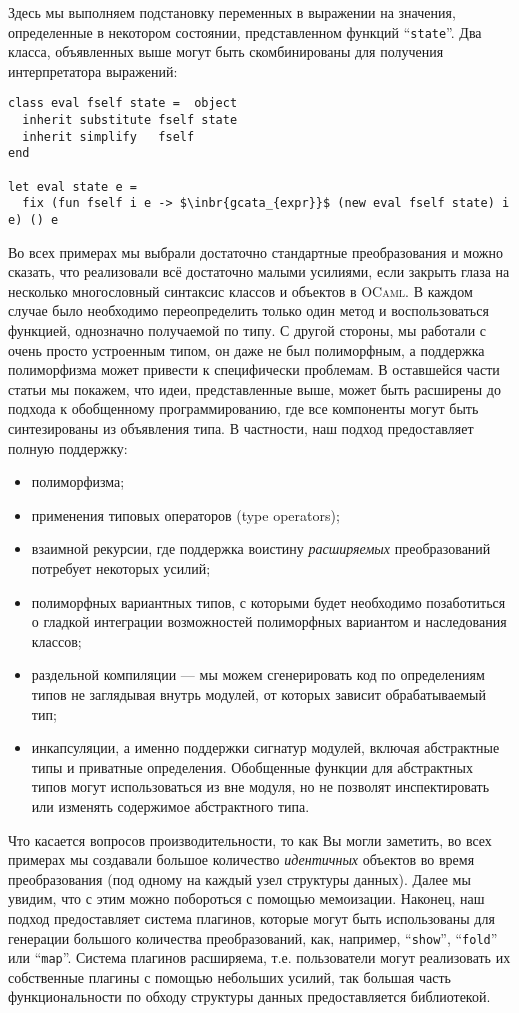 Здесь мы выполняем подстановку переменных в выражении на значения, определенные в некотором состоянии, представленном функций ``\lstinline{state}''. Два класса, объявленных выше могут быть скомбинированы для получения интерпретатора выражений:

\begin{lstlisting}
class eval fself state =  object
  inherit substitute fself state
  inherit simplify   fself
end

let eval state e =
  fix (fun fself i e -> $\inbr{gcata_{expr}}$ (new eval fself state) i e) () e  
\end{lstlisting}

Во всех примерах мы выбрали достаточно стандартные преобразования и можно сказать, что реализовали всё достаточно малыми усилиями,
если закрыть глаза на несколько многословный синтаксис классов и объектов в  \textsc{OCaml}. В каждом случае было необходимо переопределить
только один метод и воспользоваться функцией, однозначно получаемой по типу. 
С другой стороны, мы работали с очень просто устроенным типом, он даже не был полиморфным, а поддержка полиморфизма может привести к 
специфически проблемам. В оставшейся части статьи мы покажем, что идеи, представленные выше, может быть расширены до подхода к обобщенному программированию, где все компоненты могут быть синтезированы из объявления типа. В частности, наш подход предоставляет полную поддержку:

\begin{itemize}
\item полиморфизма;
\item применения типовых операторов (type operators);
\item взаимной рекурсии, где поддержка воистину \emph{расширяемых} преобразований потребует некоторых усилий;
\item полиморфных вариантных типов, с которыми будет необходимо позаботиться о гладкой интеграции возможностей полиморфных вариантом и наследования классов;
\item раздельной компиляции --- мы можем сгенерировать код по определениям типов не заглядывая внутрь модулей, от которых зависит обрабатываемый тип;
\item инкапсуляции, а именно поддержки сигнатур модулей, включая абстрактные типы и приватные определения. Обобщенные функции для абстрактных типов могут использоваться из вне модуля, но не позволят инспектировать или изменять содержимое абстрактного типа.
\end{itemize}

Что касается вопросов производительности, то как Вы могли заметить, во всех примерах мы создавали большое количество 
\emph{идентичных} объектов во время преобразования (под одному на каждый узел структуры данных). Далее мы увидим, что с этим можно побороться
с помощью мемоизации. Наконец, наш подход предоставляет система плагинов, которые могут быть использованы для генерации большого количества преобразований, как, например, ``\lstinline{show}'', ``\lstinline{fold}'' или ``\lstinline{map}''. Система плагинов расширяема, т.е. пользователи могут  реализовать их собственные плагины с помощью небольших усилий, так большая часть функциональности по обходу структуры данных предоставляется библиотекой. 
